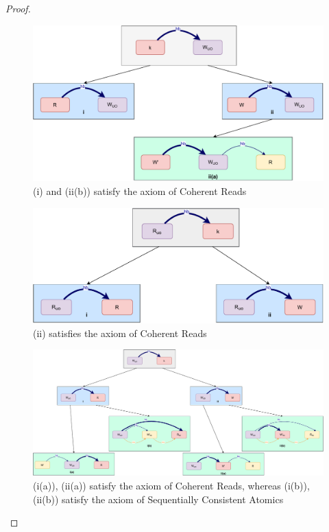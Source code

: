 \begin{proof}
        \begin{figure}[H]
            \centering
            \includegraphics[scale=0.6]{Q3_(c)Case2.pdf}
            \caption{(i) and (ii(b)) satisfy the axiom of Coherent Reads}
            \label{fig:my_label}
        \end{figure}
          
          
        \begin{figure}[H]
            \centering
            \includegraphics[scale=0.6]{Q3_(d)Case3.pdf}
            \caption{(ii) satisfies the axiom of Coherent Reads}
            \label{fig:my_label}
        \end{figure}
        
        
        \begin{figure}[H]
            \centering
            \includegraphics[scale=0.4]{Q3_(e)Case4.pdf}
            \caption{(i(a)), (ii(a)) satisfy the axiom of Coherent Reads, whereas (i(b)), (ii(b)) satisfy the axiom of Sequentially Consistent Atomics}
            \label{fig:my_label}
        \end{figure}
        

\end{proof}
